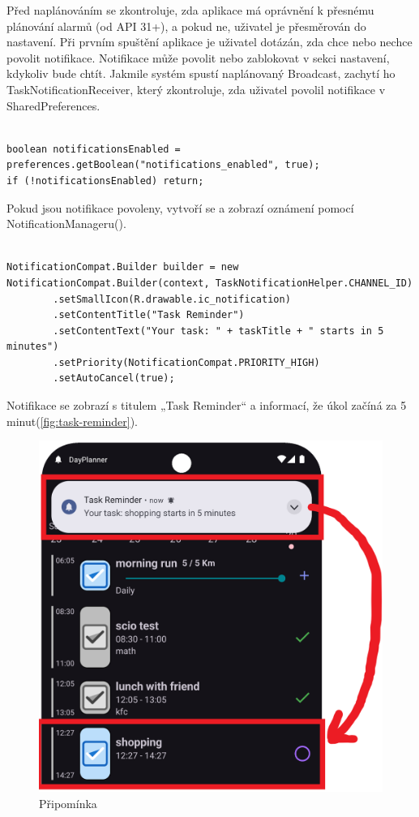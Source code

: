 Před naplánováním se zkontroluje, zda aplikace má oprávnění k přesnému plánování alarmů (od API 31+), a pokud ne, uživatel je přesměrován do nastavení. Při prvním spuštění aplikace je uživatel dotázán, zda chce nebo nechce povolit notifikace. Notifikace může povolit nebo zablokovat v sekci nastavení, kdykoliv bude chtít. Jakmile systém spustí naplánovaný Broadcast, zachytí ho TaskNotificationReceiver, který zkontroluje, zda uživatel povolil notifikace v SharedPreferences.
\newpage

\begin{lstlisting}[style=javastyle,caption = {Povolení notifikací},label = {lst:notificationsEnabled}]

boolean notificationsEnabled = preferences.getBoolean("notifications_enabled", true);
if (!notificationsEnabled) return;

\end{lstlisting}


Pokud jsou notifikace povoleny, vytvoří se a zobrazí oznámení pomocí NotificationManageru().

\begin{lstlisting}[style=javastyle,caption = {Vytvoření notifikace},label = {lst:NotifikaceDesign}]

NotificationCompat.Builder builder = new NotificationCompat.Builder(context, TaskNotificationHelper.CHANNEL_ID)
        .setSmallIcon(R.drawable.ic_notification)
        .setContentTitle("Task Reminder")
        .setContentText("Your task: " + taskTitle + " starts in 5 minutes")
        .setPriority(NotificationCompat.PRIORITY_HIGH)
        .setAutoCancel(true);

\end{lstlisting}


Notifikace se zobrazí s titulem „Task Reminder“ a informací, že úkol začíná za 5 minut(\autoref{fig:task-reminder}).

\begin{figure}[H]
    \centering
    \includegraphics[width=0.5\linewidth]{images/reminderedit.png}
    \caption{Připomínka}
    \label{fig:task-reminder}
\end{figure}

